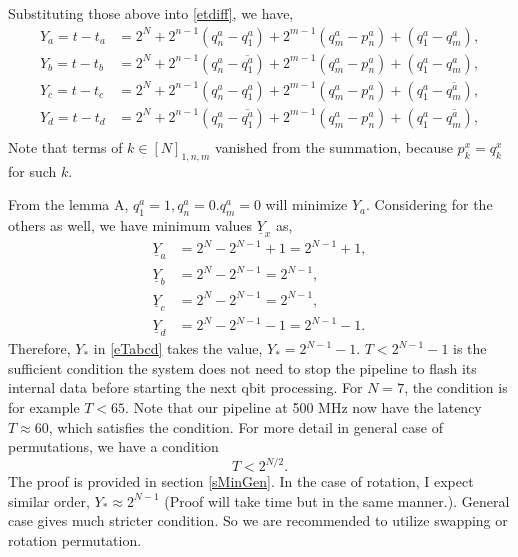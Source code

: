 \documentclass[a4paper]{article}
\newcommand{\eqlabel}[1]{\label{#1}}
\newcommand{\br}[1]{\left(#1\right)}
\renewcommand{\bar}{\overline}
\newcommand{\ubar}{\underline}
\begin{document}
Substituting those above into \eqref{etdiff}, we have,
\begin{align*}
 Y_a = t - t_a  &= 2^N + 2^{n-1}\br{q^a_n - q^a_1} + 2^{m-1}\br{q^a_m - p^a_n} + (q^a_1 - q^a_m), \\
 Y_b = t - t_b  &= 2^N + 2^{n-1}\br{q^a_n - \bar{q^a_1}} + 2^{m-1}\br{q^a_m - p^a_n} + (q^a_1 - q^a_m), \\
 Y_c = t - t_c  &= 2^N + 2^{n-1}\br{q^a_n - q^a_1} + 2^{m-1}\br{q^a_m - p^a_n} + (q^a_1 -\bar{q^a_m}), \\
 Y_d = t - t_d  &= 2^N + 2^{n-1}\br{q^a_n - \bar{q^a_1}} + 2^{m-1}\br{q^a_m - p^a_n} + (q^a_1 -\bar{q^a_m}), \\
\end{align*}
Note that terms of \(k\in[N]_{1, n, m}\) vanished from the summation, because \(p^x_k = q^x_k\) for such \(k\).

From the lemma A, \(q_1^a = 1, q_n^a =0. q_m^a = 0\) will minimize \(Y_a\). Considering for the others as well, we have minimum values \(\ubar{Y}_x\) as,
\begin{align*}
\ubar{Y}_a &= 2^{N}- 2^{N-1} + 1 = 2^{N-1} + 1, \\
\ubar{Y}_b &= 2^N - 2^{N-1} = 2^{N-1},\\ 
\ubar{Y}_c &= 2^{N} - 2^{N-1} = 2^{N-1},\\
\ubar{Y}_d &= 2^N - 2^{N-1} - 1 = 2^{N-1} -1.
\end{align*}
Therefore, \(Y_*\) in \eqref{eTabcd} takes the value, \(Y_* = 2^{N-1} -1\). \(T < 2^{N-1} -1\) is the sufficient condition the system does not need to stop the pipeline to flash its internal data before starting the next qbit processing. For \(N=7\), the condition is for example \(T < 65\). Note that our pipeline at 500 MHz now have the latency \(T \approx 60\), which satisfies the condition. For more detail in general case of permutations, we have a condition 
\begin{equation}
    \eqlabel{eTinGen}
    T < 2^{N/2}.
\end{equation}
The proof is provided in section \ref{sMinGen}. In the case of rotation, I expect similar order, \(Y_* \approx 2^{N-1}\) (Proof will take time but in the same manner.). General case gives much stricter condition. So we are recommended to utilize swapping or rotation permutation.
\end{document}
